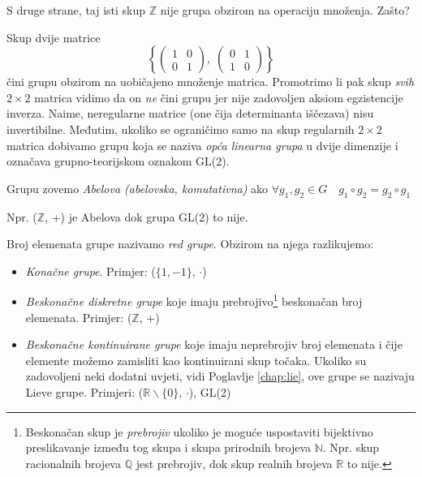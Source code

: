 \begin{primjer}
S druge strane, taj isti skup $\mathbb{Z}$ nije grupa obzirom na
operaciju množenja. Zašto? 
\end{primjer}

\begin{primjer}
Skup dvije matrice
\[\left\{
\begin{pmatrix}
1 & 0 \\ 0 & 1
\end{pmatrix}, \;
\begin{pmatrix}
0 & 1 \\ 1 & 0
\end{pmatrix}
\right\} \]
čini grupu obzirom na uobičajeno množenje matrica. Promotrimo li pak skup
\emph{svih} $2\times2$ matrica vidimo da on \emph{ne} čini grupu jer nije
zadovoljen aksiom egzistencije inverza. Naime, neregularne matrice (one
čija determinanta iščezava) nisu invertibilne. Međutim, ukoliko se
ograničimo samo na skup regularnih  $2\times2$ matrica dobivamo grupu
koja se naziva \emph{opća linearna grupa} u dvije dimenzije i označava
grupno-teorijskom oznakom GL(2).
\end{primjer}

Grupu zovemo \emph{Abelova (abelovska, komutativna)} ako 
$\forall g_1, g_2 \in G \quad g_1 \circ g_2 = g_2 \circ g_1$

Npr. ($\mathbb{Z}$, +) je Abelova dok grupa GL(2) to nije.

Broj elemenata grupe nazivamo \emph{red grupe}. Obzirom na njega razlikujemo:
\begin{itemize}
\item \emph{Konačne grupe}. Primjer: ($\{1,-1\}$, $\cdot$)
\item \emph{Beskonačne diskretne grupe} koje imaju 
prebrojivo\footnote{Beskonačan skup je \emph{prebrojiv} ukoliko je moguće uspostaviti
bijektivno preslikavanje između tog skupa i skupa prirodnih brojeva $\mathbb{N}$. Npr. skup
racionalnih brojeva $\mathbb{Q}$ jest prebrojiv, dok skup realnih brojeva
$\mathbb{R}$ to nije.}
beskonačan broj elemenata. Primjer: ($\mathbb{Z}$, +)
\item \emph{Beskonačne kontinuirane grupe} 
koje imaju neprebrojiv broj elemenata i čije elemente možemo
zamisliti kao kontinuirani skup točaka. Ukoliko su zadovoljeni neki dodatni
uvjeti, vidi Poglavlje \ref{chap:lie}, ove grupe se nazivaju Lieve grupe. 
Primjeri: ($\mathbb{R}\backslash\{0\}$, $\cdot$), GL(2)
\end{itemize}

